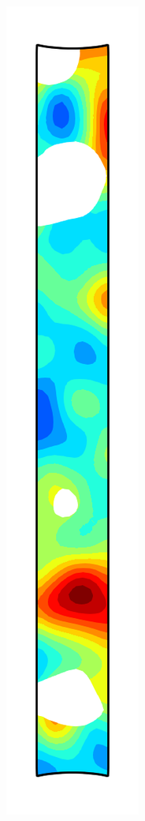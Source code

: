 \begin{figure}[!htb]
\begin{subfigure}{0.08\textwidth}
  \end{subfigure}
  \begin{subfigure}{0.08\textwidth}
    \centering
    \includegraphics[width=\textwidth]{Chapter5/figures/spallation/psie_9}

\end{subfigure}
\end{figure}
